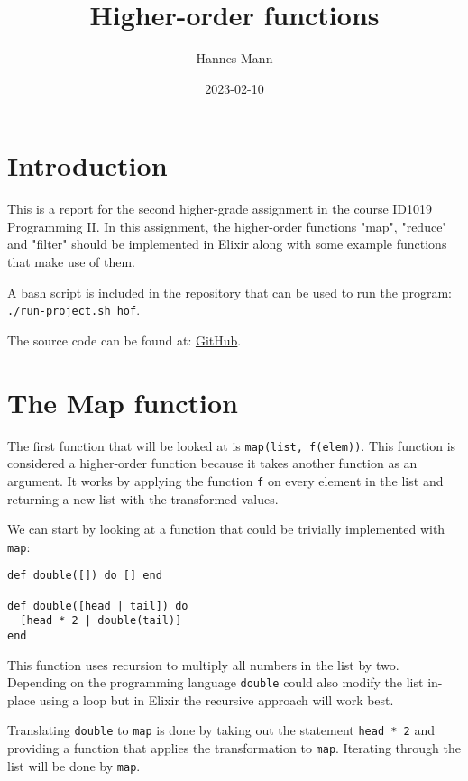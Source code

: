 \documentclass[a4paper,11pt]{article}
\begin{document}
\title{
    \textbf{Higher-order functions}
}
\author{Hannes Mann}
\date{2023-02-10}

\maketitle

\section*{Introduction}

This is a report for the second higher-grade assignment in the course ID1019 Programming II.
In this assignment, the higher-order functions "map", "reduce" and "filter" should be implemented in Elixir along with some example functions that make use of them.

A bash script is included in the repository that can be used to run the program: \texttt{./run-project.sh hof}.

The source code can be found at: \href{https://github.com/hannesmann/ID1019/tree/main/src/hof}{GitHub}.

\section*{The Map function}

The first function that will be looked at is \texttt{map(list, f(elem))}. This function is considered a higher-order function because it takes another function as an argument.
It works by applying the function \texttt{f} on every element in the list and returning a new list with the transformed values.

We can start by looking at a function that could be trivially implemented with \texttt{map}:

\begin{verbatim}
def double([]) do [] end

def double([head | tail]) do
  [head * 2 | double(tail)]
end
\end{verbatim}

This function uses recursion to multiply all numbers in the list by two.
Depending on the programming language \texttt{double} could also modify the list in-place using a loop but in Elixir the recursive approach will work best.

Translating \texttt{double} to \texttt{map} is done by taking out the statement \texttt{head * 2}
and providing a function that applies the transformation to \texttt{map}. Iterating through the list will be done by \texttt{map}.
\end{document}
